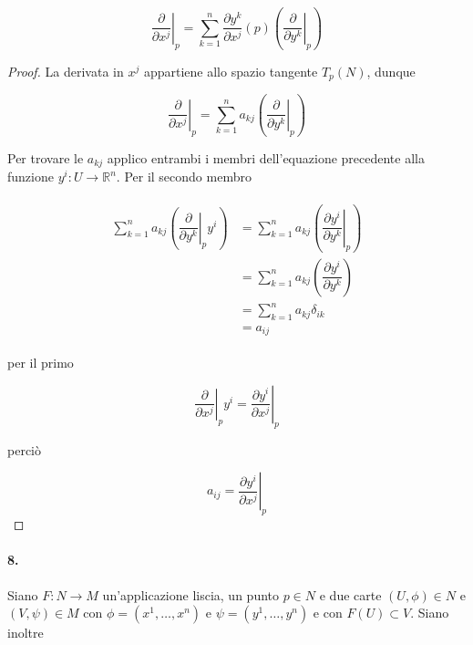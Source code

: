 \begin{equation}
	\left. \dfrac{\partial}{\partial x^{j}} \right|_{p} = \sum_{k=1}^{n} \dfrac{\partial y^{k}}{\partial x^{j}} (p) \left( \left. \dfrac{\partial}{\partial y^{k}} \right|_{p} \right)
\end{equation}

\begin{proof}
	La derivata in $ x^{j} $ appartiene allo spazio tangente $ T_{p}(N) $, dunque
	
	\begin{equation}
		\left. \dfrac{\partial}{\partial x^{j}} \right|_{p} = \sum_{k=1}^{n} a_{kj} \left( \left. \dfrac{\partial}{\partial y^{k}} \right|_{p} \right)
	\end{equation}

	Per trovare le $ a_{kj} $ applico entrambi i membri dell'equazione precedente alla funzione $ y^{i} : U \to \mathbb{R}^{n} $. Per il secondo membro
	
	\begin{align}
		\begin{split}
			\sum_{k=1}^{n} a_{kj} \left( \left. \dfrac{\partial}{\partial y^{k}} \right|_{p} y^{i} \right) &= \sum_{k=1}^{n} a_{kj} \left( \left. \dfrac{\partial y^{i}}{\partial y^{k}} \right|_{p} \right)\\
			&= \sum_{k=1}^{n} a_{kj} \left( \dfrac{\partial y^{i}}{\partial y^{k}}\right)\\
			&= \sum_{k=1}^{n} a_{kj} \delta_{ik}\\
			&= a_{ij}
		\end{split}
	\end{align}

	per il primo
	
	\begin{equation}
		\left. \dfrac{\partial}{\partial x^{j}} \right|_{p} y^{i} = \left. \dfrac{\partial y^{i}}{\partial x^{j}} \right|_{p}
	\end{equation}

	perciò
	
	\begin{equation}
		a_{ij} = \left. \dfrac{\partial y^{i}}{\partial x^{j}} \right|_{p}
	\end{equation}
\end{proof}

\paragraph{8. }

Siano $ F : N \to M $ un'applicazione liscia, un punto $ p \in N $ e due carte $ (U,\phi) \in N $ e $ (V,\psi) \in M $ con $ \phi = (x^{1},\dots,x^{n}) $ e $ \psi = (y^{1},\dots,y^{n}) $ e con $ F(U) \subset V $. Siano inoltre

